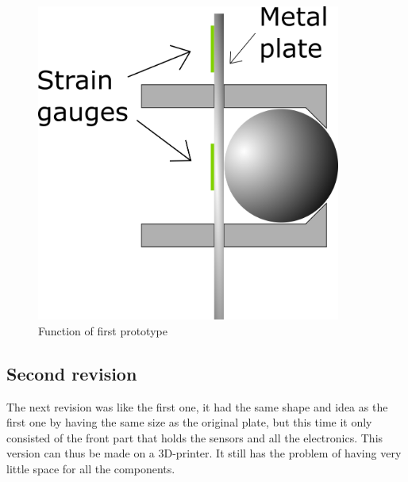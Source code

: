\begin{figure}[H]
\begin{center}
	\includegraphics[width = 10cm]{Figures/Press_sens_func_1.png}
	\caption{Function of first prototype}
	\label{Press_sens_prot_1}
\end{center}
\end{figure}

\subsection{Second revision}
The next revision was like the first one, it had the same shape and idea as the first one by having the same size as the original plate, but this time it only consisted of the front part that holds the sensors and all the electronics. This version can thus be made on a 3D-printer. It still has the problem of having very little space for all the components.    

